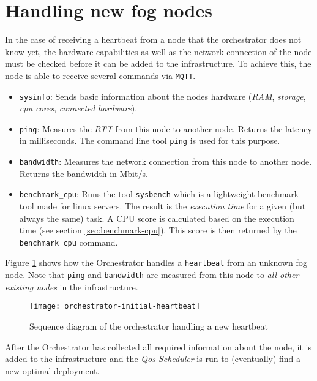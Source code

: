\section{Handling new fog nodes\label{sec:handling-new-fog-nodes}}

In the case of receiving a heartbeat from a node that the orchestrator does not know yet, the hardware capabilities as well as the network connection of the node must be checked before it can be added to the infrastructure. To achieve this, the node is able to receive several commands via \texttt{MQTT}.

\begin{itemize}
    \item \texttt{sysinfo}: Sends basic information about the nodes hardware (\textit{RAM}, \textit{storage}, \textit{cpu cores}, \textit{connected hardware}).
    \item \texttt{ping}: Measures the \textit{RTT} from this node to another node. Returns the latency in milliseconds. The command line tool \texttt{ping} is used for this purpose.
    \item \texttt{bandwidth}: Measures the network connection from this node to another node. Returns the bandwidth in Mbit/s.
    \item \texttt{benchmark\_cpu}: Runs the tool \texttt{sysbench} which is a lightweight benchmark tool made for linux servers. The result is the \textit{execution time} for a given (but always the same) task. A CPU score is calculated based on the execution time (see section \ref{sec:benchmark-cpu}). This score is then returned by the \texttt{benchmark\_cpu} command.
\end{itemize}

Figure \ref{fig:orchestrator-initial-heartbeat} shows how the Orchestrator handles a \texttt{heartbeat} from an unknown fog node. Note that \texttt{ping} and \texttt{bandwidth} are measured from this node to \textit{all other existing nodes} in the infrastructure.

\begin{figure}[htb]
    \centering
    \texttt{[image: orchestrator-initial-heartbeat]}
    \caption{Sequence diagram of the orchestrator handling a new heartbeat}
    \label{fig:orchestrator-initial-heartbeat}
\end{figure}

After the Orchestrator has collected all required information about the node, it is added to the infrastructure and the \textit{Qos Scheduler} is run to (eventually) find a new optimal deployment.

